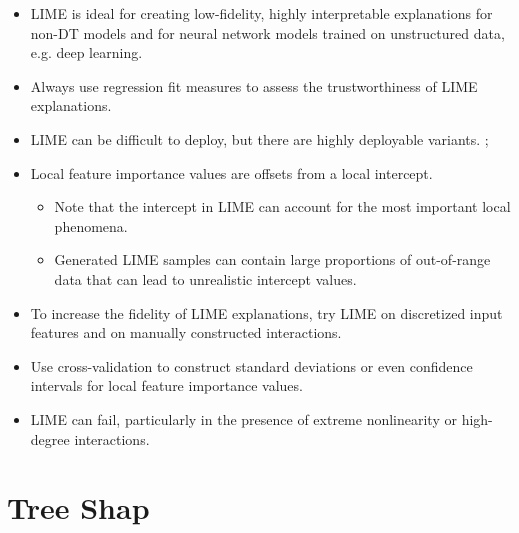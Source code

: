\documentclass{article}
\begin{document}
\begin{itemize}
	
	\item LIME is ideal for creating low-fidelity, highly interpretable explanations for non-DT models and for neural network models trained on unstructured data, e.g. deep learning.
	
	\item Always use regression fit measures to assess the trustworthiness of LIME explanations.
	
	\item LIME can be difficult to deploy, but there are highly deployable variants. \cite{lime-sup}; \cite{h2o_mli_booklet}
	
	\item Local feature importance values are offsets from a local intercept.
	
	\begin{itemize}
		
		\item Note that the intercept in LIME can account for the most important local phenomena.
		
		\item Generated LIME samples can contain large proportions of out-of-range data that can lead to unrealistic intercept values. 
		
	\end{itemize}
	
\end{itemize}

\begin{itemize}
	
	\item To increase the fidelity of LIME explanations, try LIME on discretized input features and on manually constructed interactions.
	
	\item Use cross-validation to construct standard deviations or even confidence intervals for local feature importance values.
	
	\item LIME can fail, particularly in the presence of extreme nonlinearity or high-degree interactions.
	
\end{itemize}

\section{Tree Shap} \label{sec:shap}
\end{document}
